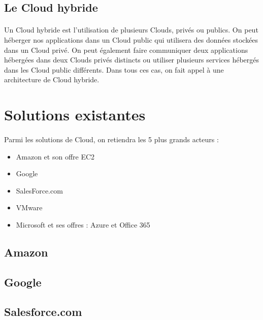\documentclass[a4paper,12pt]{report}
\begin{document}
\begin{onehalfspace}
	\subsection{Le Cloud hybride}
	
	\paragraph*{}
	Un Cloud hybride est l’utilisation de plusieurs Clouds, privés ou publics.
On peut héberger nos applications dans un Cloud public qui utilisera des données stockées dans un Cloud privé. On peut également faire communiquer deux applications hébergées dans deux Clouds privés distincts ou utiliser plusieurs services hébergés dans les Cloud public différents. Dans tous ces cas, on fait appel à une architecture de Cloud hybride.
	
	
	\section{Solutions existantes}
	
	\paragraph*{}
	Parmi les solutions de Cloud, on retiendra les 5 plus grands acteurs : 
	\begin{itemize}
		\item Amazon et son offre EC2
		\item Google
		\item SalesForce.com
		\item VMware
		\item Microsoft et ses offres : Azure et Office 365
	\end{itemize}
	
	
	\subsection{Amazon}

	\subsection{Google}

	\subsection{Salesforce.com}


\end{onehalfspace}
\end{document}

